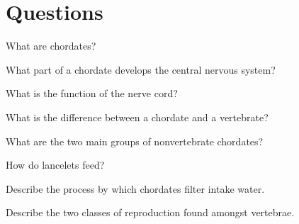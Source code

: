 \documentclass[12pt]{article} %
\begin{document}
\section*{Questions}
  \begin{qstn}
    What are chordates?
  \end{qstn}
  \begin{qstn}
    What part of a chordate develops the central nervous system?
  \end{qstn}
  \begin{qstn}
    What is the function of the nerve cord?
  \end{qstn}
  \begin{qstn}
    What is the difference between a chordate and a vertebrate?
  \end{qstn}
  \begin{qstn}
    What are the two main groups of nonvertebrate chordates?
  \end{qstn}
  \begin{qstn}
    How do lancelets feed?
  \end{qstn}
  \begin{qstn}
    Describe the process by which chordates filter intake water.
  \end{qstn}
  \begin{qstn}
    Describe the two classes of reproduction found amongst vertebrae. 
  \end{qstn}
\end{document}

